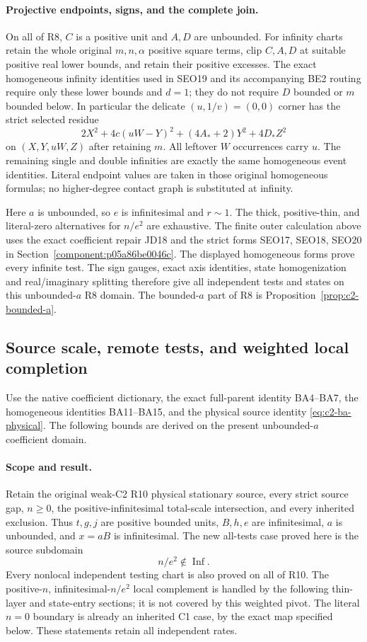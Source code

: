 \paragraph{Projective endpoints, signs, and the complete join.}
On all of R8, $C$ is a positive unit and $A,D$ are unbounded.
For infinity charts retain the whole original $m,n,\alpha$ positive square terms,
clip $C,A,D$ at suitable positive real lower bounds, and retain their
positive excesses.  The exact homogeneous infinity identities used
in SEO19 and its accompanying BE2 routing require only these lower
bounds and $d=1$; they do not require $D$ bounded or $m$ bounded
below.  In particular the delicate $(u,1/v)=(0,0)$ corner has the
strict selected residue
\[
 2X^2+4c(uW-Y)^2+(4A_*+2)Y^2+4D_*Z^2
\]
on $(X,Y,uW,Z)$ after retaining $m$.  All leftover $W$ occurrences
carry $u$.  The remaining single and double infinities are exactly
the same homogeneous event identities.  Literal endpoint values are
taken in those original homogeneous formulas; no higher-degree
contact graph is substituted at infinity.

Here $a$ is unbounded, so $e$ is infinitesimal and $r\sim1$.
The thick, positive-thin, and literal-zero alternatives for $n/e^2$
are exhaustive. The finite outer calculation above uses the exact
coefficient repair JD18 and the strict forms SEO17, SEO18, SEO20 in
Section~\ref{component:p05a86be0046c}. The displayed homogeneous
forms prove every infinite test. The sign gauges, exact axis identities,
state homogenization and real/imaginary splitting therefore give all
independent tests and states on this unbounded-$a$ R8 domain.
The bounded-$a$ part of R8 is Proposition~\ref{prop:c2-bounded-a}.

\subsection{Source scale, remote tests, and weighted local completion}
\label{component:p9ee4ba7326a7}

Use the native coefficient dictionary, the exact full-parent identity
BA4--BA7, the homogeneous identities BA11--BA15, and the physical
source identity \eqref{eq:c2-ba-physical}. The following bounds are
derived on the present unbounded-$a$ coefficient domain.

\paragraph{Scope and result.}
Retain the original weak-C2 R10 physical stationary source, every strict
source gap, $n\ge0$, the positive-infinitesimal total-scale intersection,
and every inherited exclusion. Thus $t,g,j$ are positive bounded units,
$B,h,e$ are infinitesimal, $a$ is unbounded, and $x=aB$ is infinitesimal.
The new all-tests case proved here is the source subdomain
\[
                         n/e^2\notin\operatorname{Inf}.
\tag{R10.1}
\]
Every nonlocal independent testing chart is also proved on all of R10.
The positive-$n$, infinitesimal-$n/e^2$ local complement is handled by the following thin-layer and state-entry sections; it is not covered by this weighted pivot.
The literal $n=0$ boundary is already an inherited C1 case, by the
exact map specified below. These statements retain all independent rates.

